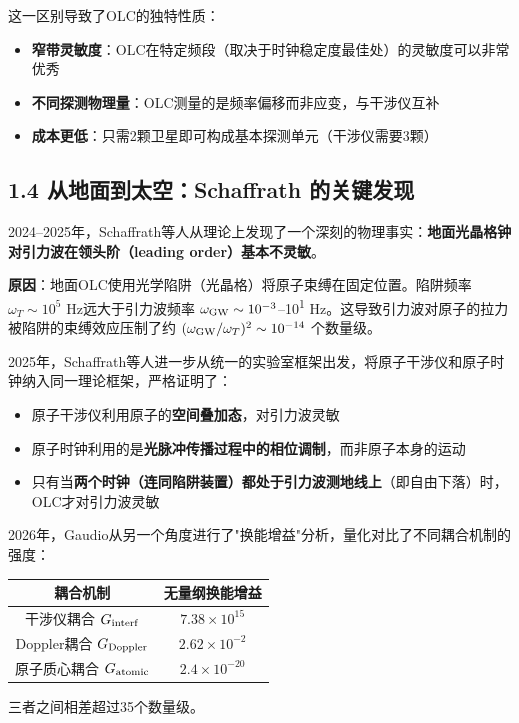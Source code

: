 \documentclass[12pt,a4paper]{article}
\begin{document}
这一区别导致了OLC的独特性质：
\begin{itemize}
  \item \textbf{窄带灵敏度}：OLC在特定频段（取决于时钟稳定度最佳处）的灵敏度可以非常优秀
  \item \textbf{不同探测物理量}：OLC测量的是频率偏移而非应变，与干涉仪互补
  \item \textbf{成本更低}：只需2颗卫星即可构成基本探测单元（干涉仪需要3颗）

\end{itemize}
\subsection{1.4 从地面到太空：Schaffrath 的关键发现}


2024–2025年，Schaffrath等人从理论上发现了一个深刻的物理事实：\textbf{地面光晶格钟对引力波在领头阶（leading order）基本不灵敏}\cite{ref7}。

\textbf{原因}：地面OLC使用光学陷阱（光晶格）将原子束缚在固定位置。陷阱频率 $\omega_T \sim 10^5$ Hz远大于引力波频率 $\omega_{\rm GW} \sim 10^{-3}$–10\textsuperscript{1} Hz。这导致引力波对原子的拉力被陷阱的束缚效应压制了约 $(\omega_{\rm GW}/\omega_T)^2 \sim 10^{-14}$ 个数量级。

2025年，Schaffrath等人进一步从统一的实验室框架出发，将原子干涉仪和原子时钟纳入同一理论框架，严格证明了：
\begin{itemize}
  \item 原子干涉仪利用原子的\textbf{空间叠加态}，对引力波灵敏
  \item 原子时钟利用的是\textbf{光脉冲传播过程中的相位调制}，而非原子本身的运动
  \item 只有当\textbf{两个时钟（连同陷阱装置）都处于引力波测地线上}（即自由下落）时，OLC才对引力波灵敏\cite{ref7}
\end{itemize}

2026年，Gaudio从另一个角度进行了"换能增益"分析，量化对比了不同耦合机制的强度\cite{ref8}：

\begin{tabular}{|c|c|}
\hline
耦合机制 & 无量纲换能增益 \\
\hline
干涉仪耦合 $G_{\rm interf}$ & $7.38 \times 10^{15}$ \\
Doppler耦合 $G_{\rm Doppler}$ & $2.62 \times 10^{-2}$ \\
原子质心耦合 $G_{\rm atomic}$ & $2.4 \times 10^{-20}$ \\
\hline
\end{tabular}


三者之间相差超过35个数量级。
\end{document}
